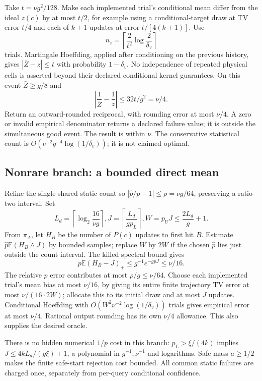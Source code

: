 \documentclass[11pt]{article}
\newcommand{\E}{\mathbb E}
\begin{document}
Take $t=\nu g^2/128$. Make each implemented trial's conditional mean
differ from the ideal $z(c)$ by at most $t/2$, for example using a
conditional-target draw at TV error $t/4$ and each of $k+1$ updates at
error $t/[4(k+1)]$. Use
\[
 n_z=\left\lceil\frac{2}{t^2}\log\frac2{\delta_v}\right\rceil
\]
trials. Martingale Hoeffding, applied after conditioning on the previous
history, gives $|\bar Z-z|\le t$ with probability $1-\delta_v$.
No independence of repeated physical cells is asserted beyond their
declared conditional kernel guarantees. On this event $\bar Z\ge g/8$
and
\[
 \left|\frac1{\bar Z}-\frac1z\right|\le32t/g^2=\nu/4.
\]
Return an outward-rounded reciprocal, with rounding error at most
$\nu/4$. A zero or invalid empirical denominator returns a declared
failure value; it is outside the simultaneous good event. The result is
within $\nu$. The conservative statistical count is
$O(\nu^{-2}g^{-4}\log(1/\delta_v))$; it is not claimed optimal.

\subsection{Nonrare branch: a bounded direct mean}
Refine the single shared static count so
$|\widehat p/p-1|\le\rho=\nu g/64$, preserving a ratio-two interval.
Set
\[
 L_d=\left\lceil\log_2\frac{16}{\nu g}\right\rceil,
 J=\left\lceil\frac{L_d}{gp_L}\right\rceil,
 W=p_UJ\le\frac{2L_d}{g}+1.
\]
From $\pi_A$, let $H_B$ be the number of $P(c)$ updates to first hit $B$.
Estimate $\widehat p\E(H_B\wedge J)$ by bounded samples; replace $W$
by $2W$ if the chosen $\widehat p$ lies just outside the count interval.
The killed spectral bound gives
\[
 p\E(H_B-J)_+\le g^{-1}e^{-gpJ}\le\nu/16.
\]
The relative $p$ error contributes at most $\rho/g\le\nu/64$.
Choose each implemented trial's mean bias at most $\nu/16$, by giving
its entire finite trajectory TV error at most $\nu/(16\cdot2W)$;
allocate this to its initial draw and at most $J$ updates. Conditional
Hoeffding with $O(W^2\nu^{-2}\log(1/\delta_v))$ trials gives empirical
error at most $\nu/4$. Rational output rounding has its own $\nu/4$
allowance. This also supplies the desired oracle.

There is no hidden numerical $1/p$ cost in this branch:
$p_L>\xi/(4k)$ implies
$J\le4kL_d/(g\xi)+1$, a polynomial in $g^{-1},\nu^{-1}$ and logarithms.
Safe mass $a\ge1/2$ makes the finite safe-start rejection cost bounded.
All common static failures are charged once, separately from per-query
conditional confidence.
\end{document}
